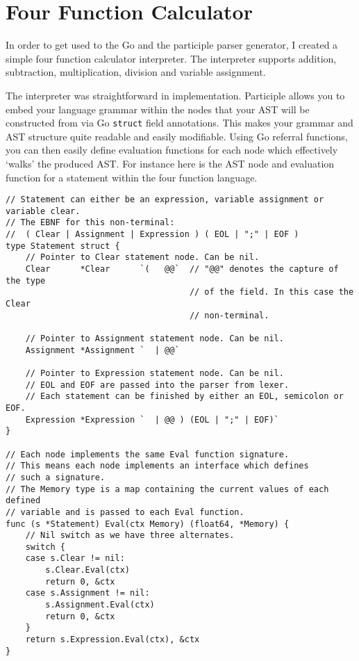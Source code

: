 \section{Four Function Calculator}
\label{sec:four-func-calculator}

In order to get used to the Go and the participle parser generator, I created a simple four function calculator interpreter. The interpreter supports addition, subtraction, multiplication, division and variable assignment.

The interpreter was straightforward in implementation. Participle allows you to embed your language grammar within the nodes that your AST will be constructed from via Go \verb|struct| field annotations. This makes your grammar and AST structure quite readable and easily modifiable. Using Go referral functions, you can then easily define evaluation functions for each node which effectively `walks' the produced AST. For instance here is the AST node and evaluation function for a statement within the four function language.

\begin{verbatim}
// Statement can either be an expression, variable assignment or variable clear.
// The EBNF for this non-terminal:
//  ( Clear | Assignment | Expression ) ( EOL | ";" | EOF )
type Statement struct {
    // Pointer to Clear statement node. Can be nil.
    Clear      *Clear      `(   @@`  // "@@" denotes the capture of the type 
                                     // of the field. In this case the Clear
                                     // non-terminal.

    // Pointer to Assignment statement node. Can be nil.
    Assignment *Assignment `  | @@`

    // Pointer to Expression statement node. Can be nil.
    // EOL and EOF are passed into the parser from lexer.
    // Each statement can be finished by either an EOL, semicolon or EOF.
    Expression *Expression `  | @@ ) (EOL | ";" | EOF)`
}

// Each node implements the same Eval function signature.
// This means each node implements an interface which defines
// such a signature.
// The Memory type is a map containing the current values of each defined
// variable and is passed to each Eval function.
func (s *Statement) Eval(ctx Memory) (float64, *Memory) {
    // Nil switch as we have three alternates.
    switch {
    case s.Clear != nil:
        s.Clear.Eval(ctx)
        return 0, &ctx
    case s.Assignment != nil:
        s.Assignment.Eval(ctx)
        return 0, &ctx
    }
    return s.Expression.Eval(ctx), &ctx
}
\end{verbatim}

